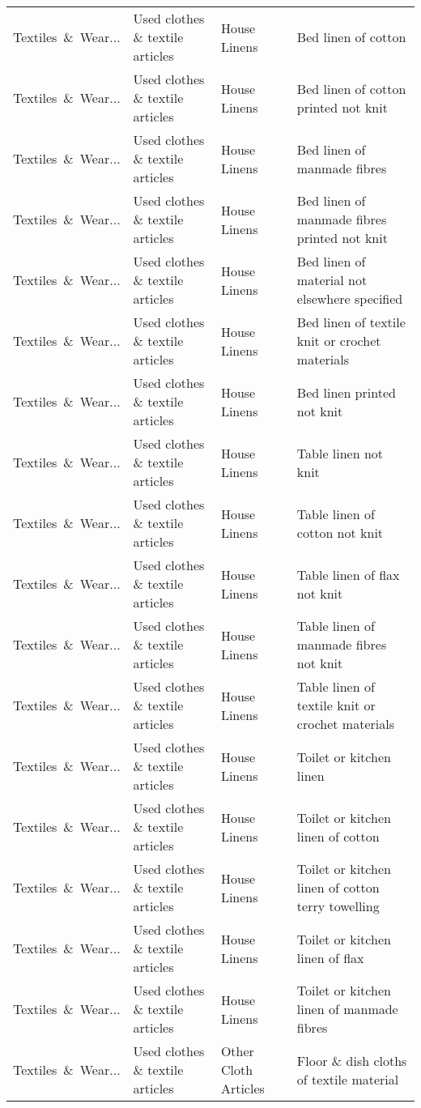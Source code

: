 \begin{appendices}
\begin{xltabular}{\textwidth}{|p{0.10\textwidth}|p{0.25\textwidth}|p{0.24\textwidth}|p{0.31\textwidth}|}
Textiles\ \&\ Wear... & Used clothes \& textile articles & House Linens & Bed linen of cotton \\
Textiles\ \&\ Wear... & Used clothes \& textile articles & House Linens & Bed linen of cotton printed not knit \\
Textiles\ \&\ Wear... & Used clothes \& textile articles & House Linens & Bed linen of manmade fibres \\
Textiles\ \&\ Wear... & Used clothes \& textile articles & House Linens & Bed linen of manmade fibres printed not knit \\
Textiles\ \&\ Wear... & Used clothes \& textile articles & House Linens & Bed linen of material not elsewhere specified \\
Textiles\ \&\ Wear... & Used clothes \& textile articles & House Linens & Bed linen of textile knit or crochet materials \\
Textiles\ \&\ Wear... & Used clothes \& textile articles & House Linens & Bed linen printed not knit \\
Textiles\ \&\ Wear... & Used clothes \& textile articles & House Linens & Table linen not knit \\
Textiles\ \&\ Wear... & Used clothes \& textile articles & House Linens & Table linen of cotton not knit \\
Textiles\ \&\ Wear... & Used clothes \& textile articles & House Linens & Table linen of flax not knit \\
Textiles\ \&\ Wear... & Used clothes \& textile articles & House Linens & Table linen of manmade fibres not knit \\
Textiles\ \&\ Wear... & Used clothes \& textile articles & House Linens & Table linen of textile knit or crochet materials \\
Textiles\ \&\ Wear... & Used clothes \& textile articles & House Linens & Toilet or kitchen linen \\
Textiles\ \&\ Wear... & Used clothes \& textile articles & House Linens & Toilet or kitchen linen of cotton \\
Textiles\ \&\ Wear... & Used clothes \& textile articles & House Linens & Toilet or kitchen linen of cotton terry towelling \\
Textiles\ \&\ Wear... & Used clothes \& textile articles & House Linens & Toilet or kitchen linen of flax \\
Textiles\ \&\ Wear... & Used clothes \& textile articles & House Linens & Toilet or kitchen linen of manmade fibres \\
Textiles\ \&\ Wear... & Used clothes \& textile articles & Other Cloth Articles & Floor \& dish cloths of textile material \\

\end{xltabular}
\end{appendices}
